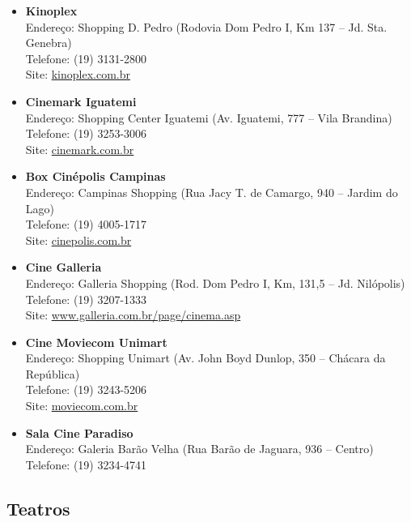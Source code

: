 \begin{itemize}
\item   \textbf{Kinoplex}
		\\Endereço: Shopping D. Pedro (Rodovia Dom Pedro I, Km 137 -- Jd. Sta. Genebra)
		\\Telefone: (19) 3131-2800
		\\Site: \url{kinoplex.com.br}

\item   \textbf{Cinemark Iguatemi}
		\\Endereço: Shopping Center Iguatemi (Av. Iguatemi, 777 -- Vila Brandina)
		\\Telefone: (19) 3253-3006
		\\Site: \url{cinemark.com.br}

\item   \textbf{Box Cinépolis Campinas}
		\\Endereço: Campinas Shopping (Rua Jacy T. de Camargo, 940 -- Jardim do Lago)
		\\Telefone: (19) 4005-1717
		\\Site: \url{cinepolis.com.br}

\item   \textbf{Cine Galleria}
		\\Endereço: Galleria Shopping (Rod. Dom Pedro I, Km, 131,5 -- Jd. Nilópolis)
		\\Telefone: (19) 3207-1333
		\\Site: \url{www.galleria.com.br/page/cinema.asp}

\item   \textbf{Cine Moviecom Unimart}
		\\Endereço: Shopping Unimart (Av. John Boyd Dunlop, 350 -- Chácara da República)
		\\Telefone: (19) 3243-5206
		\\Site: \url{moviecom.com.br}

\item   \textbf{Sala Cine Paradiso}
		\\Endereço: Galeria Barão Velha (Rua Barão de Jaguara, 936 -- Centro)
		\\Telefone: (19) 3234-4741
\end{itemize}

\subsection{Teatros}

